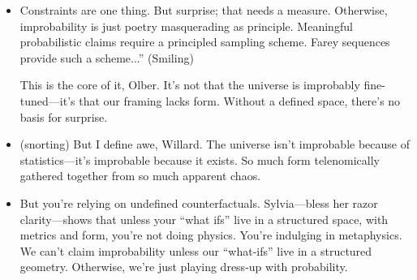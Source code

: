 \begin{itemize}[leftmargin=2cm, label={}]

\item[\textbf{Willard:}]  
Constraints are one thing. But surprise; that needs a measure.  
Otherwise, improbability is just poetry masquerading as principle. Meaningful probabilistic claims require a principled sampling scheme. Farey sequences provide such a scheme...” 
(Smiling) 

This is the core of it, Olber. It's not that the universe is improbably fine-tuned—it's that our framing lacks form. Without a defined space, there's no basis for surprise.

\item[\textbf{Ernest:}] (snorting) But I define awe, Willard. The universe isn’t improbable because of statistics—it’s improbable because it exists. So much form telenomically gathered together from so much apparent chaos.

\item[\textbf{Willard:}] But you’re relying on undefined counterfactuals. Sylvia—bless her razor clarity—shows that unless your “what ifs” live in a structured space, with metrics and form, you’re not doing physics. You’re indulging in metaphysics. We can’t claim improbability unless our “what-ifs” live in a structured geometry. Otherwise, we’re just playing dress-up with probability.
\end{itemize}
